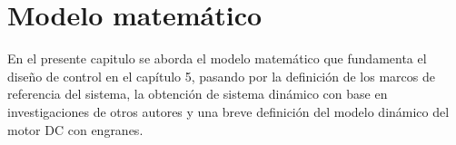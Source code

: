 \chapter{Modelo matemático}

En el presente capitulo se aborda el modelo matemático que fundamenta el diseño de control en el capítulo 5, pasando por
la definición de los marcos de referencia del sistema, la obtención de sistema dinámico con base en
investigaciones de otros autores y una breve definición del modelo dinámico del motor DC con engranes.

